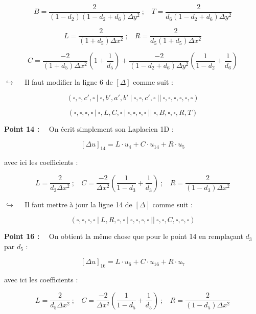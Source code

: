 \documentclass[12pt]{article}
\begin{document}
$$B = \frac{2}{(1-d_2)(1-d_2 + d_6)\Delta y^2}~;~~~~ T = \frac{2}{d_6(1-d_2 + d_6)\Delta y^2}$$

$$L = \frac{2}{(1+d_5) \Delta x^2}~;~~~~ R = \frac{2}{d_5 (1+d_5) \Delta x^2}$$

$$C = \frac{-2}{(1+d_5) \Delta x^2} \left( 1 + \frac{1}{d_5} \right) + \frac{-2}{(1-d_2 + d_6)\Delta y^2} \left( \frac{1}{1-d_2} + \frac{1}{d_6} \right)$$

\vspace{5 mm}

$\hookrightarrow$~~ Il faut modifier la ligne 6 de $[\Delta]$ comme suit :

$$(\square,\square,c',\square~|~\square,b',a',b'~|~\square,\square,c',\square~||~\square,\square,\square,\square,\square,\square)$$

$$(\square,\square,\square,\square~|~\square,L,C,\square~|~\square,\square,\square,\square~||~\square,B,\square,\square,R,T)$$

\vspace{5 mm}

\noindent
\textbf{Point 14 :}~~ On écrit simplement son Laplacien 1D :

$$[\Delta u]_{14} = L \cdot u_{4} + C \cdot u_{14} + R \cdot u_{5}$$

\vspace{5 mm}
\noindent
avec ici les coefficients :

$$L = \frac{2}{d_3 \Delta x^2}~;~~~~ C = \frac{-2}{\Delta x^2} \left( \frac{1}{1-d_3} + \frac{1}{d_3} \right)~;~~~~ R = \frac{2}{(1-d_3) \Delta x^2}$$

\vspace{5 mm}

$\hookrightarrow$~~ Il faut mettre à jour la ligne 14 de $[\Delta]$ comme suit :

$$(\square,\square,\square,\square~|~L,R,\square,\square~|~\square,\square,\square,\square~||~\square,\square,C,\square,\square,\square)$$

\vspace{5 mm}

\noindent
\textbf{Point 16 :}~~ On obtient la même chose que pour le point 14 en remplaçant $d_3$ par $d_5$ :

$$[\Delta u]_{16} = L \cdot u_{6} + C \cdot u_{16} + R \cdot u_{7}$$

\vspace{5 mm}
\noindent
avec ici les coefficients :

$$L = \frac{2}{d_5 \Delta x^2}~;~~~~ C = \frac{-2}{\Delta x^2} \left( \frac{1}{1-d_5} + \frac{1}{d_5} \right)~;~~~~ R = \frac{2}{(1-d_5) \Delta x^2}$$
\end{document}
